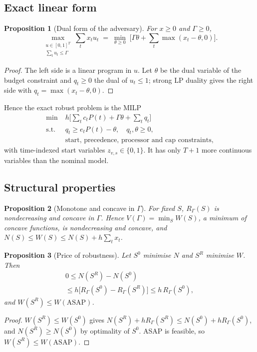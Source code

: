 \documentclass[conference,11pt]{IEEEtran}
\newtheorem{proposition}{Proposition}
\theoremstyle{definition}\newtheorem{remark}{Remark}
\begin{document}
\subsection{Exact linear form}
\begin{proposition}[Dual form of the adversary]\label{prop:dual}
For $x\ge0$ and $\Gamma\ge0$,
\begin{equation}
\max_{\substack{u\in[0,1]^T\\ \sum_tu_t\le\Gamma}}\sum_t x_tu_t \;=\; \min_{\theta\ge0}\;\Big[\Gamma\theta+\sum_t\max(x_t-\theta,0)\Big].\label{eq:dual}
\end{equation}
\end{proposition}
\begin{proof}
The left side is a linear program in $u$. Let $\theta$ be the dual variable of the budget constraint and $q_t\ge0$ the dual of $u_t\le1$; strong LP duality gives the right side with $q_t=\max(x_t-\theta,0)$.
\end{proof}
Hence the exact robust problem is the MILP
\begin{align}
\min\;& h\Big[\sum_tc_tP(t)+\Gamma\theta+\sum_tq_t\Big]\label{eq:obj}\\
\text{s.t.}\;& q_t\ge e_tP(t)-\theta,\quad q_t,\theta\ge0,\label{eq:rob}\\
& \text{start, precedence, processor and cap constraints},\nonumber
\end{align}
with time-indexed start variables $z_{v,s}\in\{0,1\}$. It has only $T+1$ more continuous variables than the nominal model.

\subsection{Structural properties}
\begin{proposition}[Monotone and concave in $\Gamma$]\label{prop:conc}
For fixed $S$, $R_\Gamma(S)$ is nondecreasing and concave in $\Gamma$. Hence $V(\Gamma)=\min_SW(S)$, a minimum of concave functions, is nondecreasing and concave, and $N(S)\le W(S)\le N(S)+h\sum_tx_t$.
\end{proposition}
\begin{proposition}[Price of robustness]\label{prop:price}
Let $S^0$ minimise $N$ and $S^R$ minimise $W$. Then
\begin{multline}
0\le N(S^R)-N(S^0)\\\le h\big[R_\Gamma(S^0)-R_\Gamma(S^R)\big]\le h\,R_\Gamma(S^0),
\end{multline}
and $W(S^R)\le W(\mathrm{ASAP})$.
\end{proposition}
\begin{proof}
$W(S^R)\le W(S^0)$ gives $N(S^R)+hR_\Gamma(S^R)\le N(S^0)+hR_\Gamma(S^0)$, and $N(S^R)\ge N(S^0)$ by optimality of $S^0$. ASAP is feasible, so $W(S^R)\le W(\mathrm{ASAP})$.
\end{proof}
\end{document}
